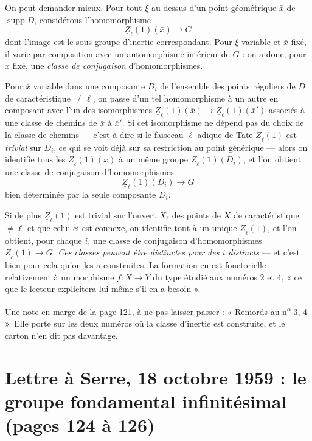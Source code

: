 \documentclass[11pt,a4paper]{article}
\begin{document}
On peut demander mieux. Pour tout $\xi$ au-dessus d'un point géométrique
$\bar{x}$ de $\operatorname{supp} D$, considérons l'homomorphisme
\[
  \underline{Z}_{\ell}(1)(\bar{x}) \longrightarrow G
\]
dont l'image est le sous-groupe d'inertie correspondant. Pour $\xi$ variable et
$\bar{x}$ fixé, il varie par composition avec un automorphisme intérieur de
$G$ : on a donc, pour $\bar{x}$ fixé, une \emph{classe de conjugaison}
d'homomorphismes.

Pour $\bar{x}$ variable dans une composante $D_{i}$ de l'ensemble des points
réguliers de $D$ de caractéristique $\neq \ell$, on passe d'un tel homomorphisme
à un autre en composant avec l'un des isomorphismes
$\underline{Z}_{\ell}(1)(\bar{x}) \to \underline{Z}_{\ell}(1)(\bar{x}')$
associés à une classe de chemins de $\bar{x}$ à $\bar{x}'$. Si cet isomorphisme
ne dépend pas du choix de la classe de chemins --- c'est-à-dire si le faisceau
$\ell$-adique de Tate $\underline{Z}_{\ell}(1)$ est \emph{trivial} sur
$D_{i}$, ce qui se voit déjà sur sa restriction au point générique --- alors on
identifie tous les $\underline{Z}_{\ell}(1)(\bar{x})$ à un même groupe
$\underline{Z}_{\ell}(1)(D_{i})$, et l'on obtient une classe de conjugaison
d'homomorphismes
\[
  \underline{Z}_{\ell}(1)(D_{i}) \longrightarrow G
\]
bien déterminée par la seule composante $D_{i}$.

Si de plus $\underline{Z}_{\ell}(1)$ est trivial sur l'ouvert $X_{\ell}$ des
points de $X$ de caractéristique $\neq \ell$ et que celui-ci est connexe, on
identifie tout à un unique $\underline{Z}_{\ell}(1)$, et l'on obtient, pour
chaque $i$, une classe de conjugaison d'homomorphismes
$\underline{Z}_{\ell}(1) \to G$. \emph{Ces classes peuvent être distinctes pour
des $i$ distincts} --- et c'est bien pour cela qu'on les a construites. La
formation en est fonctorielle relativement à un morphisme $f : X \to Y$ du type
étudié aux numéros 2 et 4, « ce que le lecteur explicitera lui-même s'il en a
besoin ».

Une note en marge de la page 121, à ne pas laisser passer : « Remords au
n\textsuperscript{o} 3, 4 ». Elle porte sur les deux numéros où la classe
d'inertie est construite, et le carton n'en dit pas davantage.

\section*{Lettre à Serre, 18 octobre 1959 : le groupe fondamental infinitésimal (pages 124 à 126)}
\end{document}
